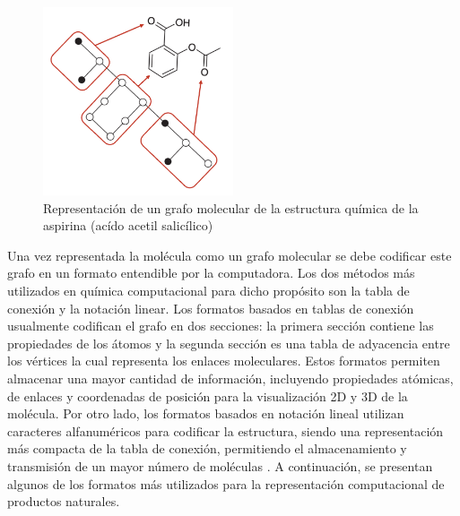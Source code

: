 \begin{figure}[h!]
    \centering
    \includegraphics[width=0.5\textwidth]{Images/np-graph-representation.png}
    \caption{Representación de un grafo molecular de la estructura química de la aspirina (acído acetil salicílico)}
    \label{fig:np-graph-representation}
\end{figure}


Una vez representada la molécula como un grafo molecular se debe codificar este grafo en un formato entendible por la computadora. 
Los dos métodos más utilizados en química computacional para dicho propósito son la tabla de conexión y la notación linear. 
Los formatos basados en tablas de conexión usualmente codifican el grafo en dos secciones: la primera sección contiene las propiedades de los átomos y la segunda sección es una tabla de adyacencia entre los vértices la cual representa los enlaces moleculares. 
Estos formatos permiten almacenar una mayor cantidad de información, incluyendo propiedades atómicas, de enlaces y coordenadas de posición para la visualización 2D y 3D de la molécula. 
Por otro lado, los formatos basados en notación lineal utilizan caracteres alfanuméricos para codificar la estructura, siendo una representación más compacta de la tabla de conexión, permitiendo el almacenamiento y transmisión de un mayor número de moléculas \cites*{leach2007introduction,heller2015inchi}. A continuación, se presentan algunos de los formatos más utilizados para la representación computacional de productos naturales.

